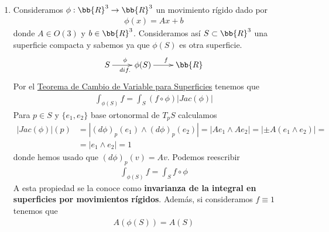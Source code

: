 \begin{ejemplo}\
    \begin{enumerate}
        \item Consideramos $\phi: \bb{R}^3 \to \bb{R}^3$ un movimiento rígido dado por 
        \begin{gather*}
            \phi(x) = Ax + b 
        \end{gather*}
        donde $A\in O(3)$ y $b\in \bb{R}^3$. Consideramos así $S\subset \bb{R}^3$ una superficie compacta y sabemos ya que $\phi(S)$ es otra superficie.
        \begin{gather*}
            \xymatrix{
                S \ar[r]^{\phi}_{dif.} & \phi(S) \ar[r]^f & \bb{R}
            }
        \end{gather*}
        Por el \hyperref[teo:cambio_variable_teo:cambio_variable_integral_sup]{Teorema de Cambio de Variable para Superficies} tenemos que 
        \begin{gather*}
            \int_{\phi(S)} f = \int_S (f\circ \phi)|Jac(\phi)|
        \end{gather*} 
        Para $p\in S$ y $\{e_1, e_2\}$ base ortonormal de $T_pS$ calculamos
        \begin{align*}
            |Jac(\phi)|(p) &= 
            |(d\phi)_p(e_1)\wedge(d\phi)_p(e_2)| = 
            |Ae_1 \wedge Ae_2| = 
            |\pm A(e_1\wedge e_2)| = \\
            &=
            |e_1\wedge e_2| = 1
        \end{align*}
        donde hemos usado que $(d\phi)_p(v) = Av$. Podemos reescribir
        \begin{gather*}
            \boxed{\int_{\phi(S)} f = \int_S f\circ \phi}
        \end{gather*}
        A esta propiedad se la conoce como \textbf{invarianza de la integral en superficies por movimientos rígidos}. Además, si consideramos $f\equiv 1$ tenemos que 
        \begin{gather*}
            \boxed{A(\phi(S)) = A(S)}
        \end{gather*}


\end{enumerate}
\end{ejemplo}
